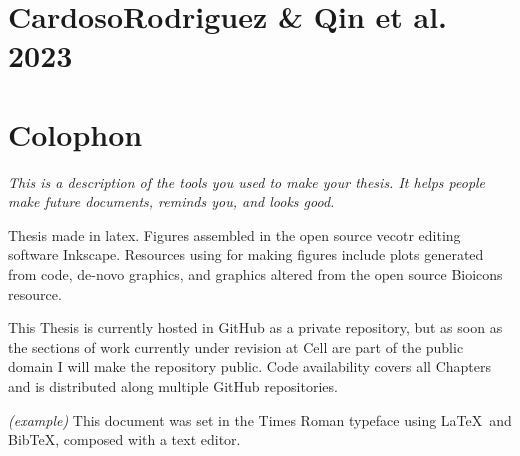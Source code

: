 \chapter{CardosoRodriguez \& Qin et al. 2023}
\label{appendix:XXX}





\chapter{Colophon}
\label{appendix3label}
\textit{This is a description of the tools you used to make your thesis. It helps people make future documents, reminds you, and looks good.}

Thesis made in latex. Figures assembled in the open source vecotr editing software Inkscape. Resources using for making figures include plots generated from code, de-novo graphics, and graphics altered from the open source Bioicons resource. 

This Thesis is currently hosted in GitHub as a private repository, but as soon as the sections of work currently under revision at Cell are part of the public domain I will make the repository public. Code availability covers all Chapters and is distributed along multiple GitHub repositories.

\textit{(example)} This document was set in the Times Roman typeface using \LaTeX\ and Bib\TeX , composed with a text editor. 

